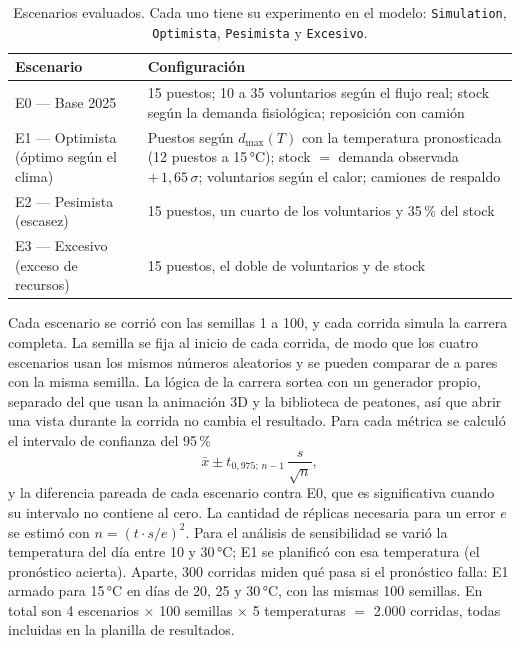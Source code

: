 \documentclass[11pt,a4paper]{article}
\begin{document}
\begin{table}[H]
\centering
\small
\begin{tabular}{P{3.6cm}P{11.6cm}}
\toprule
\textbf{Escenario} & \textbf{Configuración} \\
\midrule
E0 — Base 2025 & 15 puestos; 10 a 35 voluntarios según el flujo real; stock según la demanda fisiológica; reposición con camión \\
E1 — Optimista (óptimo según el clima) & Puestos según $d_{\max}(T)$ con la temperatura pronosticada (12 puestos a 15\,°C); stock $=$ demanda observada $+\,1{,}65\,\sigma$; voluntarios según el calor; camiones de respaldo \\
E2 — Pesimista (escasez) & 15 puestos, un cuarto de los voluntarios y 35\,\% del stock \\
E3 — Excesivo (exceso de recursos) & 15 puestos, el doble de voluntarios y de stock \\
\bottomrule
\end{tabular}
\caption{Escenarios evaluados. Cada uno tiene su experimento en el modelo: \texttt{Simulation}, \texttt{Optimista}, \texttt{Pesimista} y \texttt{Excesivo}.}
\label{tab:escenarios-def}
\end{table}

Cada escenario se corrió con las semillas 1 a 100, y cada corrida simula la carrera completa. La semilla se fija al inicio de cada corrida, de modo que los cuatro escenarios usan los mismos números aleatorios y se pueden comparar de a pares con la misma semilla. La lógica de la carrera sortea con un generador propio, separado del que usan la animación 3D y la biblioteca de peatones, así que abrir una vista durante la corrida no cambia el resultado. Para cada métrica se calculó el intervalo de confianza del 95\,\%
\begin{equation}
    \bar{x} \pm t_{0{,}975;\,n-1} \, \frac{s}{\sqrt{n}},
\end{equation}
y la diferencia pareada de cada escenario contra E0, que es significativa cuando su intervalo no contiene al cero. La cantidad de réplicas necesaria para un error $e$ se estimó con $n = (t \cdot s / e)^2$. Para el análisis de sensibilidad se varió la temperatura del día entre 10 y 30\,°C; E1 se planificó con esa temperatura (el pronóstico acierta). Aparte, 300 corridas miden qué pasa si el pronóstico falla: E1 armado para 15\,°C en días de 20, 25 y 30\,°C, con las mismas 100 semillas. En total son 4 escenarios $\times$ 100 semillas $\times$ 5 temperaturas $=$ 2.000 corridas, todas incluidas en la planilla de resultados.
\end{document}
